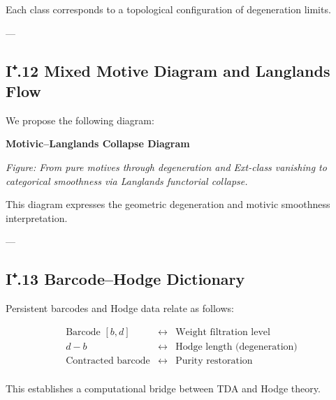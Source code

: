 \documentclass[11pt]{article}
\begin{document}
Each class corresponds to a topological configuration of degeneration limits.

---

\subsection*{I⁺.12 Mixed Motive Diagram and Langlands Flow}

We propose the following diagram:

\vspace{1.5em}
\noindent\textbf{Motivic–Langlands Collapse Diagram}

\vspace{0.5em}
\noindent
\begin{minipage}{\textwidth}
\centering
{}
\vspace{0.5em}

\small\textit{Figure: From pure motives through degeneration and Ext-class vanishing to categorical smoothness via Langlands functorial collapse.}
\end{minipage}

This diagram expresses the geometric degeneration and motivic smoothness interpretation.

---

\subsection*{I⁺.13 Barcode–Hodge Dictionary}

Persistent barcodes and Hodge data relate as follows:

\[
\begin{array}{ccc}
\text{Barcode } [b,d] & \leftrightarrow & \text{Weight filtration level} \\
d - b & \leftrightarrow & \text{Hodge length (degeneration)} \\
\text{Contracted barcode} & \leftrightarrow & \text{Purity restoration} \\
\end{array}
\]

This establishes a computational bridge between TDA and Hodge theory.
\end{document}
